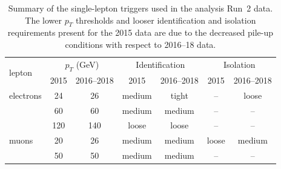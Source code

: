 \begin{table}[h!]
\centering
\begin{tabular}{lcc|cc|cc}
\hline\hline
\multirow{2}{*}{lepton} & \multicolumn{2}{c|}{$p_{T}$ (GeV)} & \multicolumn{2}{c|}{Identification} & \multicolumn{2}{c}{Isolation} \\
 & 2015 & 2016--2018 & 2015 & 2016--2018 & 2015 & 2016--2018 \\
\hline
electrons & 24  & 26  & medium & tight   & -- & loose \\
          & 60  & 60  & medium & medium  & -- & -- \\
          & 120 & 140 & loose  & loose   & -- & -- \\
\hline
muons     & 20  & 26  & medium & medium  & loose  & medium \\
          & 50  & 50  & medium & medium  & --     & -- \\
\hline\hline
\end{tabular}
\caption{Summary of the single-lepton triggers used in the analysis Run~2 data. The lower $p_{T}$ thresholds and looser identification and isolation requirements present for the 2015 data are due to the decreased pile-up conditions with respect to 2016--18 data.}
\label{tab:single_lepton_triggers}
\end{table}
